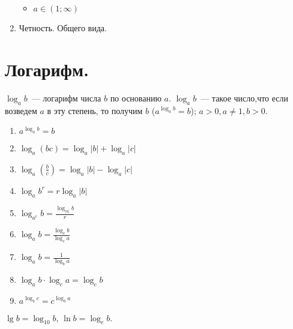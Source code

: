 \documentclass[12pt]{article}
\begin{document}
\begin{property}
\begin{enumerate}
\begin{itemize}
\begin{figure}[H]
				\end{figure}
				\item $a \in (1; \infty)$
				\begin{figure}[H]
				\end{figure}
			\end{itemize}
			\item Четность. Общего вида.
		\end{enumerate}
	\end{property}
	\section{Логарифм.}
	\begin{definition}
		$\log_ab$~--- логарифм числа $b$ по основанию $a$. $\log_ab$~--- такое число,что если возведем $a$ в эту степень, то получим $b$ ($a^{\log_ab} = b$); $a > 0, a\not=1, b > 0$.
	\end{definition}
	\begin{property}
		\begin{enumerate}
			\item $a^{\log_ab} = b$
			\item $\log_a(bc) = \log_a|b| + \log_a|c|$
			\item $\log_a(\frac{b}{c}) = \log_a|b| - \log_a|c|$
			\item $\log_ab^r = r\log_a|b|$
			\item $\log_{a^r}b = \frac{\log_{|a|}b}{r}$
			\item $\log_ab = \frac{\log_cb}{\log_ca}$
			\item $\log_ab = \frac{1}{\log_ba}$
			\item $\log_ab \cdot \log_ca = \log_cb$
			\item $a^{\log_bc} = c^{\log_ba}$
		\end{enumerate}
	\end{property}
	\begin{note}
		$\lg b = \log_{10}b$, $\ln b = \log_{e}b$.
	\end{note}
\end{document}
